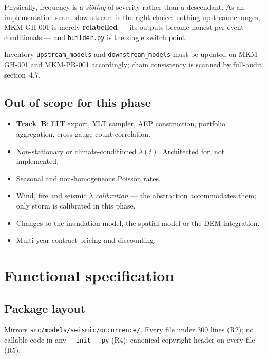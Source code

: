 \documentclass[11pt]{article}
\begin{document}
\noindent Physically, frequency is a \emph{sibling} of severity rather than a
descendant. As an implementation seam, downstream is the right choice: nothing
upstream changes, MKM-GH-001 is merely \textbf{relabelled} --- its outputs become
honest per-event conditionals --- and \texttt{builder.py} is the single switch
point.

Inventory \texttt{upstream\_models} and \texttt{downstream\_models} must be
updated on MKM-GH-001 and MKM-PR-001 accordingly; chain consistency is scanned
by full-audit section~4.7.

\subsection{Out of scope for this phase}

\begin{itemize}[nosep]
  \item \textbf{Track~B}: ELT export, YLT sampler, AEP construction, portfolio
        aggregation, cross-gauge count correlation.
  \item Non-stationary or climate-conditioned $\lambda(t)$. Architected for, not
        implemented.
  \item Seasonal and non-homogeneous Poisson rates.
  \item Wind, fire and seismic $\lambda$ \emph{calibration} --- the abstraction
        accommodates them; only storm is calibrated in this phase.
  \item Changes to the inundation model, the spatial model or the DEM
        integration.
  \item Multi-year contract pricing and discounting.
\end{itemize}

\section{Functional specification}

\subsection{Package layout}

Mirrors \texttt{src/models/seismic/occurrence/}. Every file under 300 lines
(R2); no callable code in any \texttt{\_\_init\_\_.py} (R4); canonical copyright
header on every file (R5).
\end{document}
